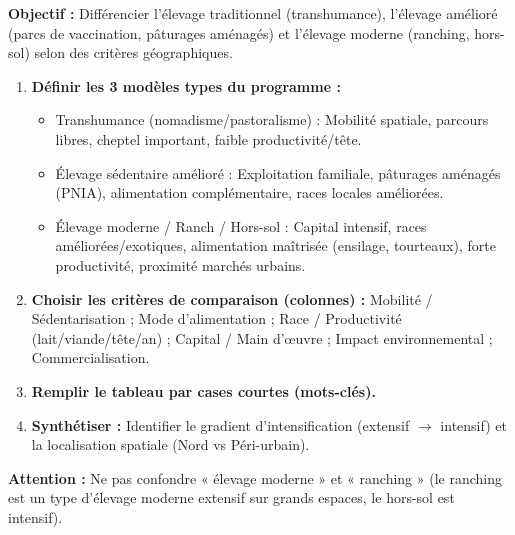 \documentclass[11pt]{article}
\newcommand{\cle}[1]{{\popxbold\color{popdark}#1}}
\begin{document}
\begin{methode}
\textbf{Objectif :} Différencier l'élevage traditionnel (transhumance), l'élevage amélioré (parcs de vaccination, pâturages aménagés) et l'élevage moderne (ranching, hors-sol) selon des critères géographiques.
\begin{enumerate}
    \item \textbf{Définir les 3 modèles types du programme :}
    \begin{itemize}
        \item \cle{Transhumance} (nomadisme/pastoralisme) : Mobilité spatiale, parcours libres, cheptel important, faible productivité/tête.
        \item \cle{Élevage sédentaire amélioré} : Exploitation familiale, pâturages aménagés (PNIA), alimentation complémentaire, races locales améliorées.
        \item \cle{Élevage moderne / Ranch / Hors-sol} : Capital intensif, races améliorées/exotiques, alimentation maîtrisée (ensilage, tourteaux), forte productivité, proximité marchés urbains.
    \end{itemize}
    \item \textbf{Choisir les critères de comparaison (colonnes) :} Mobilité / Sédentarisation ; Mode d'alimentation ; Race / Productivité (lait/viande/tête/an) ; Capital / Main d'œuvre ; Impact environnemental ; Commercialisation.
    \item \textbf{Remplir le tableau par cases courtes (mots-clés).}
    \item \textbf{Synthétiser :} Identifier le gradient d'intensification (extensif $\to$ intensif) et la localisation spatiale (Nord vs Péri-urbain).
\end{enumerate}
\textbf{Attention :} Ne pas confondre « élevage moderne » et « ranching » (le ranching est un type d'élevage moderne extensif sur grands espaces, le hors-sol est intensif).
\end{methode}
\end{document}
